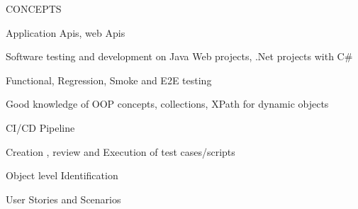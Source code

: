 \begin{cventries}
    
  \cventry
    {CONCEPTS}
    {}
    {}
    {}
    {
      \begin{cvitems} %
        \item {Application Apis, web Apis}
	\item {Software testing and development on Java Web projects, .Net projects with C\#}	
	\item {Functional, Regression, Smoke and E2E testing}	
	\item {Good knowledge of OOP concepts, collections, XPath for dynamic objects}	
	\item {CI/CD Pipeline}	
	\item {Creation , review and Execution of test cases/scripts}	
	\item {Object level Identification}	
	\item {User Stories and Scenarios}	
      \end{cvitems}
    }

\end{cventries}
